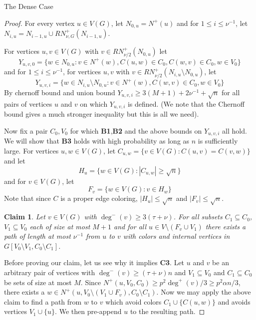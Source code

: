 \documentclass[11pt,a4paper]{article}
\newtheorem{claim}[subsection]{Claim}
\begin{document}
\begin{section}{The Dense Case}
\begin{proof}
For every vertex $u \in V(G)$, let $N_{0, u} = N^+(u)$ and for $1 \leq i \leq \nu^{-1}$, let $N_{i, u} = N_{i - 1, u} \cup RN^+_{\nu, G} (N_{i - 1, u})$.

\medskip

For vertices $u, v \in V(G)$ with $v \in RN^+_{\nu/2} (N_{0, u} )$ let
\[
Y_{u, v, 0} = \{ w \in N_{0, u} : v \in N^+(w), C(u, w) \in C_0, C(w, v) \in C_0, w \in V_0 \}
\]
and for $1 \leq i \leq \nu^{-1}$, for vertices $u, v$ with $v \in RN^+_{\nu/2} ( N_{i, u} \setminus N_{0, u} )$, let
\[
Y_{u, v, i} = \{ w \in N_{i, u} \setminus N_{0, u} : v \in N^+(w), C(w, v) \in C_0, w \in V_0 \}
\]
By chernoff bound and union bound $Y_{u, v, i} \geq 3(M  + 1) + 2\nu^{-1} + \sqrt n $ for all pairs of vertices $u$ and $v$ on which $Y_{u, v, i}$ is defined. (We note that the Chernoff bound gives a much stronger inequality but this is all we need). 

\medskip

Now fix a pair $C_0, V_0$ for which \textbf{B1},\textbf{B2} and the above bounds on $Y_{u, v, i}$ all hold. We will show that \textbf{B3} holds with high probability as long as $n$ is sufficiently large. For vertices $u, w \in V(G)$, let $C_{u, w} = \{ v \in V(G):  C(u, v) = C(v, w) \}$ and let
\[
H_{u} = \{ w \in V(G) :  | C_{u, w } | \geq \sqrt n \}
\]
and for $v \in V(G)$, let
\[
F_{v} = \{ w \in V(G) : v \in H_w \}
\]
Note that since $C$ is a proper edge coloring, $|H_{u}| \leq \sqrt n$ and $|F_{v}| \leq \sqrt n$. 
\begin{claim} Let $v \in V(G)$ with $\deg^{-}(v) \geq 3(\tau + \nu)$. For all subsets $C_1 \subseteq C_0$, $V_1 \subseteq V_0$ each of size at most $M + 1$ and for all $u \in V \setminus (F_v \cup V_1)$ there exists a path of length at most $\nu^{-1}$ from $u$ to $v$ with colors and internal vertices in  $G[ V_0 \setminus V_1, C_0 \setminus C_1]$.  
\end{claim}
Before proving our claim, let us see why it implies \textbf{C3}. Let $u$ and $v$ be an arbitrary pair of vertices with $\deg^{-}(v) \geq (\tau + \nu)n$ and $V_1 \subseteq V_0$ and $C_1 \subseteq C_0$ be sets of size at most $M$. Since $N^+ (u, V_0, C_0) \geq p^2 \deg^{+}(v)/3 \geq p^2 \alpha n/3$, there exists a $w \in N^+(u, V_0 \setminus (V_1 \cup F_v), C_0 \setminus C_1)$. Now we may apply the above claim to find a path from $w$ to $v$ which avoid colors $C_1 \cup \{ C(u, w) \}$ and avoids vertices $V_1 \cup \{u\}$. We then pre-append $u$ to the resulting path.

\medskip


\end{proof}
\end{section}
\end{document}
